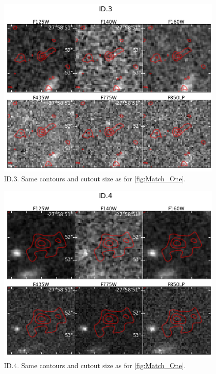 \begin{figure}[tbp]
\centering \includegraphics[width=160mm]{Matched/ASPECS_Cutout_2.jpg}
\caption{ID.3. Same contours and cutout size as for \ref{fig:Match_One}.}
\label{fig:Match_Three}
\end{figure}

\begin{figure}[tbp]
\centering \includegraphics[width=160mm]{Matched/ASPECS_Cutout_3.jpg}
\caption{ID.4. Same contours and cutout size as for \ref{fig:Match_One}.}
\label{fig:Match_Three}
\end{figure}

